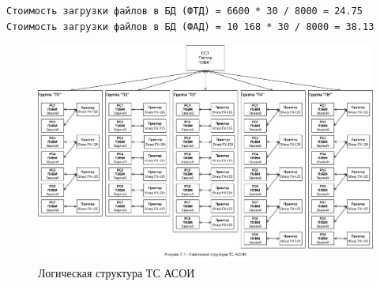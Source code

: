 \documentclass[12pt, a4paper, simple]{eskdtext}
\begin{document}
\begin{lstlisting}[language=MyFormula]
Стоимость загрузки файлов в БД (ФТД) = 6600 * 30 / 8000 = 24.75
Стоимость загрузки файлов в БД (ФАД) = 10 168 * 30 / 8000 = 38.13
\end{lstlisting}

    \newpage

    \begin{figure}[h!]
        \centering
        \includegraphics[width=16cm]
            {_docs/Рисунок7-1ЛогическаяСтруктураТСАСОИ.png}
        \caption{Логическая структура ТС АСОИ}
    \end{figure}


%     



\end{document}
